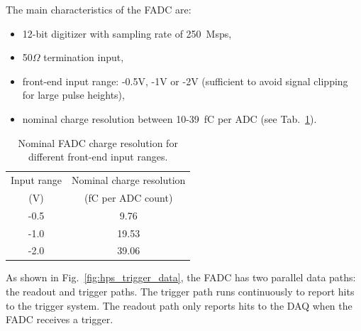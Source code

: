 
The main characteristics of the FADC are:
\begin{itemize}
\item 12-bit digitizer with sampling rate of 250~Msps, 
\item 50$\Omega$ termination input, 
\item front-end input range:  -0.5V, -1V or -2V (sufficient to avoid signal clipping for large pulse heights),
\item nominal charge resolution between 10-39~fC per ADC (see Tab.~\ref{tab:charge_resolution}).
\end{itemize}
\begin{table}[ht]
\centering
\begin{tabular}{|c|c|}
\hline
Input range & Nominal charge resolution\\
(V) & (fC per ADC count)\\\hline
-0.5 & 9.76  \\\hline
-1.0 & 19.53  \\\hline
-2.0 & 39.06 \\\hline
\end{tabular}
\caption{Nominal FADC charge resolution for different front-end input ranges.}
\label{tab:charge_resolution}
\end{table}
As shown in Fig.~\ref{fig:hps_trigger_data}, the FADC has two parallel data paths: the readout and trigger paths. The trigger path runs continuously to report hits to the trigger system. The readout path only reports hits to the DAQ when the FADC receives a trigger.

